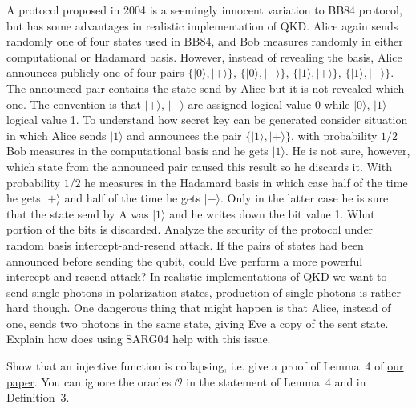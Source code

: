\documentclass[a4paper,10pt,landscape,twocolumn]{scrartcl}
\newcommand{\ket}[1]{| #1 \rangle}
\begin{document}
\begin{exercise}
A protocol proposed in 2004 is a seemingly innocent variation to BB84 protocol, but has some advantages in realistic implementation of QKD. Alice again sends randomly one of four states used in BB84, and Bob measures randomly in either computational or Hadamard basis. However, instead of revealing the basis, Alice announces publicly one of four pairs $\{ \ket{0},\ket{+} \}$, $\{ \ket{0},\ket{-} \}$, $\{ \ket{1},\ket{+} \}$, $\{ \ket{1},\ket{-} \}$. The announced pair contains the state send by Alice but it is not revealed which one. The convention is that $\ket{+}$, $\ket{-}$ are assigned logical value 0 while $\ket{0}$, $\ket{1}$ logical value 1. To understand how secret key can be generated consider situation in which Alice sends $\ket{1}$ and announces the pair $\{ \ket{1},\ket{+} \}$, with probability $1/2$ Bob measures in the computational basis and he gets $\ket{1}$. He is not sure, however, which state from the announced pair caused this result so he discards it. With probability $1/2$ he measures in the Hadamard basis in which case half of the time he gets $\ket{+}$ and half of the time he gets $\ket{-}$. Only in the latter case he is sure that the state send by A was $\ket{1}$ and he writes down the bit value 1. What portion of the bits is discarded. Analyze the security of the protocol under random basis intercept-and-resend attack. If the pairs of states had been announced before sending the qubit, could Eve perform a more powerful intercept-and-resend attack? In realistic implementations of QKD we want to send single photons in polarization states, production of single photons is rather hard though. One dangerous thing that might happen is that Alice, instead of one, sends two photons in the same state, giving Eve a copy of the sent state. Explain how does using SARG04 help with this issue.
\end{exercise}



\begin{exercise}
Show that an injective function is collapsing, i.e. give a proof of Lemma~4 of \href{https://eprint.iacr.org/2017/771.pdf}{our paper}. You can ignore the oracles $\mathcal{O}$ in the statement of Lemma~4 and in Definition~3.
\end{exercise}
\end{document}

